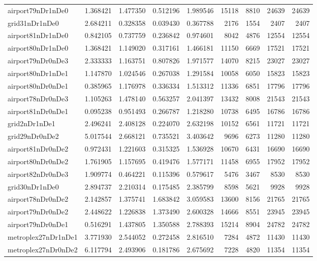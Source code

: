 \begin{longtable}{|l|r|r|r|r|r|r|r|r|}
airport79nDr1nDe0 & 1.368421 & 1.477350 & 0.512196 & 1.989546 & 15118 & 8810 & 24639 & 24639 \\
grid31nDr1nDe0 & 2.684211 & 0.328358 & 0.039430 & 0.367788 & 2176 & 1554 & 2407 & 2407 \\
airport81nDr1nDe0 & 0.842105 & 0.737759 & 0.236842 & 0.974601 & 8042 & 4876 & 12554 & 12554 \\
airport80nDr1nDe0 & 1.368421 & 1.149020 & 0.317161 & 1.466181 & 11150 & 6669 & 17521 & 17521 \\
airport79nDr0nDe3 & 2.333333 & 1.163751 & 0.807826 & 1.971577 & 14070 & 8215 & 23027 & 23027 \\
airport80nDr1nDe1 & 1.147870 & 1.024546 & 0.267038 & 1.291584 & 10058 & 6050 & 15823 & 15823 \\
airport80nDr0nDe1 & 0.385965 & 1.176978 & 0.336334 & 1.513312 & 11336 & 6851 & 17796 & 17796 \\
airport78nDr0nDe3 & 1.105263 & 1.478140 & 0.563257 & 2.041397 & 13432 & 8008 & 21543 & 21543 \\
airport81nDr0nDe1 & 0.095238 & 0.951493 & 0.266787 & 1.218280 & 10738 & 6495 & 16786 & 16786 \\
grid2nDr1nDe1 & 2.496241 & 2.408128 & 0.224070 & 2.632198 & 10152 & 6561 & 11721 & 11721 \\
grid29nDr0nDe2 & 5.017544 & 2.668121 & 0.735521 & 3.403642 & 9696 & 6273 & 11280 & 11280 \\
airport81nDr0nDe2 & 0.972431 & 1.221603 & 0.315325 & 1.536928 & 10670 & 6431 & 16690 & 16690 \\
airport80nDr0nDe2 & 1.761905 & 1.157695 & 0.419476 & 1.577171 & 11458 & 6955 & 17952 & 17952 \\
airport82nDr0nDe3 & 1.909774 & 0.464221 & 0.115396 & 0.579617 & 5476 & 3467 & 8530 & 8530 \\
grid30nDr1nDe0 & 2.894737 & 2.210314 & 0.175485 & 2.385799 & 8598 & 5621 & 9928 & 9928 \\
airport78nDr0nDe2 & 2.142857 & 1.375741 & 1.683842 & 3.059583 & 13600 & 8156 & 21765 & 21765 \\
airport79nDr0nDe2 & 2.448622 & 1.226838 & 1.373490 & 2.600328 & 14666 & 8551 & 23945 & 23945 \\
airport79nDr0nDe1 & 0.516291 & 1.437805 & 1.350588 & 2.788393 & 15214 & 8904 & 24782 & 24782 \\
metroplex27nDr1nDe1 & 3.771930 & 2.544052 & 0.272458 & 2.816510 & 7284 & 4872 & 11430 & 11430 \\
metroplex27nDr0nDe2 & 6.117794 & 2.493906 & 0.181786 & 2.675692 & 7228 & 4820 & 11354 & 11354 \\

\end{longtable}
